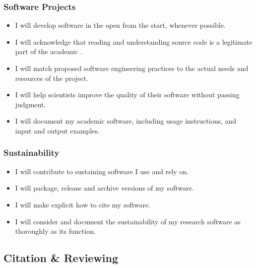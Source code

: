 \documentclass[a4paper,UKenglish]{dagman}
\renewcommand{\paragraph}[1]{\subsubsection*{#1}\xspace}
\begin{document}
\paragraph{Software Projects}
\begin{itemize}
\item I will develop software in the open from the start, whenever possible.
\item I will acknowledge that reading and understanding source code is a legitimate part of the academic .
\item I will match proposed software engineering practices to the actual needs and resources of the project.
\item I will help scientists improve the quality of their software without passing judgment.
\item I will document my academic software, including usage instructions, and input and output examples.
\end{itemize}

\paragraph{Sustainability}
\begin{itemize}
\item I will contribute to sustaining software I use and rely on. 
\item I will package, release and archive versions of my software.
\item I will make explicit how to cite my software.
\item I will consider and document the sustainability of my research software as thoroughly as its function.
\end{itemize}


\subsection{Citation \& Reviewing}
\end{document}
